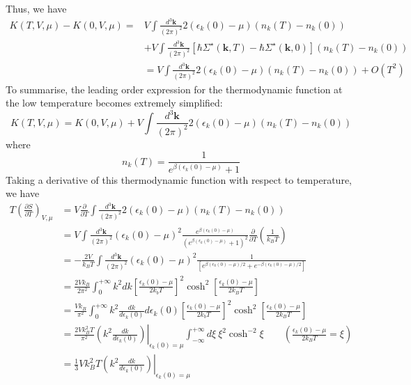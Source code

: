  Thus, we have
\begin{equation}\label{4.6.23}
\begin{aligned}
K(T,V,\mu)-K(0,V,\mu)=&V\int \frac{d^3 \mathbf{k}}{(2\pi)^2} 2(\epsilon_k(0)-\mu) (n_k(T)-n_k(0))\\
&+V\int \frac{d^3 \mathbf{k}}{(2\pi)^2}  \left[\hbar \Sigma^\star (\mathbf{k},T) - \hbar \Sigma^\star (\mathbf{k},0) \right] (n_k(T)-n_k(0))\\
&=V\int \frac{d^3 \mathbf{k}}{(2\pi)^2} 2(\epsilon_k(0)-\mu) (n_k(T)-n_k(0))+O(T^2)
\end{aligned}
\end{equation}
 To summarise, the leading order expression for the thermodynamic function at the low temperature becomes extremely simplified:
\begin{equation} \tag{4.6.24}
K(T,V,\mu)=K(0,V,\mu)+V\int \frac{d^3 \mathbf{k}}{(2\pi)^2} 2(\epsilon_k(0)-\mu) (n_k(T)-n_k(0))
\end{equation}
where
\begin{equation}\tag{4.6.24'}
n_k(T)=\frac{1}{e^{\beta(\epsilon_k(0)-\mu)}+1}
\end{equation}
 Taking a derivative of this thermodynamic function with respect to temperature, we have
\[
\begin{aligned}
T\left( \frac{\partial S}{\partial T} \right)_{V,\mu}&=V\frac{\partial}{\partial T} \int \frac{d^3 \mathbf{k}}{(2\pi)^2} 2(\epsilon_k(0)-\mu) (n_k(T)-n_k(0))\\
&=V \int \frac{d^3 \mathbf{k}}{(2\pi)^2} (\epsilon_k(0)-\mu)^2 \frac{e^{\beta(\epsilon_k(0)-\mu)}}{\left(e^{\beta(\epsilon_k(0)-\mu)}+1\right)^2} \frac{\partial}{\partial T} \left( \frac{1}{k_B T} \right)\\
&=-\frac{2V}{k_B T} \int \frac{d^3 \mathbf{k}}{(2\pi)^2} (\epsilon_k(0)-\mu)^2 \frac{1}{\left[ e^{\beta(\epsilon_k(0)-\mu)/2} +e^{-\beta(\epsilon_k(0)-\mu)/2} \right]}\\
&=\frac{2V k_B}{2\pi^2} \int_0^{+\infty} k^2 dk \left[ \frac{\epsilon_k(0)-\mu}{2k_b T} \right]^2 \cosh^2 \left[ \frac{\epsilon_k(0)-\mu}{2k_B T} \right]\\
&=\frac{V k_B}{\pi^2}  \int_0^{+\infty} k^2 \frac{dk}{d\epsilon_k(0)} d\epsilon_k(0) \left[ \frac{\epsilon_k(0)-\mu}{2k_b T} \right]^2 \cosh^2 \left[ \frac{\epsilon_k(0)-\mu}{2k_B T} \right]\\
&=\frac{2V k_B^2 T}{\pi^2} \left. \left( k^2 \frac{dk}{d\epsilon_k(0)} \right) \right|_{\epsilon_k(0)=\mu} \int_{-\infty}^{+\infty} d\xi \ \xi^2 \cosh^{-2} \xi\qquad 
\left( \frac{\epsilon_k(0)-\mu}{2k_B T}=\xi \right)\\
&=\frac{1}{3}V k_B^2 T \left. \left( k^2 \frac{dk}{d\epsilon_k(0)} \right) \right|_{\epsilon_k(0)=\mu} 
\end{aligned}
\]
